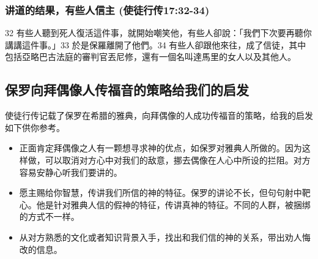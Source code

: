 \subsubsection{讲道的结果，有些人信主 (使徒行传17:32-34)}
32 有些人聽到死人復活這件事，就開始嘲笑他，有些人卻說：「我們下次要再聽你講講這件事。」33 於是保羅離開了他們。34 有些人卻跟他來往，成了信徒，其中包括亞略巴古法庭的審判官丟尼修，還有一個名叫達馬里的女人以及其他人。

\subsection{保罗向拜偶像人传福音的策略给我们的启发}
使徒行传记载了保罗在希腊的雅典，向拜偶像的人成功传福音的策略，给我的启发如下供你参考。
\begin{itemize}
\item 正面肯定拜偶像之人有一颗想寻求神的优点，如保罗对雅典人所做的。因为这样做，可以取消对方心中对我们的敌意，挪去偶像在人心中所设的拦阻。对方容易安静心听我们要讲的。
\item 愿主赐给你智慧，传讲我们所信的神的特征。保罗的讲论不长，但句句射中靶心。他是针对雅典人信的假神的特征，传讲真神的特征。不同的人群，被捆绑的方式不一样。
\item 从对方熟悉的文化或者知识背景入手，找出和我们信的神的关系，带出劝人悔改的信息。
\end{itemize}





